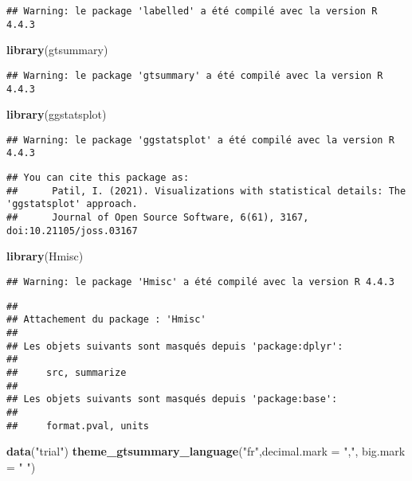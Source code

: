 \documentclass[
]{article}
\newenvironment{Shaded}{\begin{snugshade}}{\end{snugshade}}
\newcommand{\AttributeTok}[1]{\textcolor[rgb]{0.13,0.29,0.53}{#1}}
\newcommand{\FunctionTok}[1]{\textcolor[rgb]{0.13,0.29,0.53}{\textbf{#1}}}
\newcommand{\NormalTok}[1]{#1}
\newcommand{\StringTok}[1]{\textcolor[rgb]{0.31,0.60,0.02}{#1}}
\begin{document}
\begin{verbatim}
## Warning: le package 'labelled' a été compilé avec la version R 4.4.3
\end{verbatim}

\begin{Shaded}
\begin{Highlighting}[]
\FunctionTok{library}\NormalTok{(gtsummary)}
\end{Highlighting}
\end{Shaded}

\begin{verbatim}
## Warning: le package 'gtsummary' a été compilé avec la version R 4.4.3
\end{verbatim}

\begin{Shaded}
\begin{Highlighting}[]
\FunctionTok{library}\NormalTok{(ggstatsplot)}
\end{Highlighting}
\end{Shaded}

\begin{verbatim}
## Warning: le package 'ggstatsplot' a été compilé avec la version R 4.4.3
\end{verbatim}

\begin{verbatim}
## You can cite this package as:
##      Patil, I. (2021). Visualizations with statistical details: The 'ggstatsplot' approach.
##      Journal of Open Source Software, 6(61), 3167, doi:10.21105/joss.03167
\end{verbatim}

\begin{Shaded}
\begin{Highlighting}[]
\FunctionTok{library}\NormalTok{(Hmisc)}
\end{Highlighting}
\end{Shaded}

\begin{verbatim}
## Warning: le package 'Hmisc' a été compilé avec la version R 4.4.3
\end{verbatim}

\begin{verbatim}
## 
## Attachement du package : 'Hmisc'
## 
## Les objets suivants sont masqués depuis 'package:dplyr':
## 
##     src, summarize
## 
## Les objets suivants sont masqués depuis 'package:base':
## 
##     format.pval, units
\end{verbatim}

\begin{Shaded}
\begin{Highlighting}[]
\FunctionTok{data}\NormalTok{(}\StringTok{"trial"}\NormalTok{)}
\FunctionTok{theme\_gtsummary\_language}\NormalTok{(}\StringTok{"fr"}\NormalTok{,}\AttributeTok{decimal.mark =} \StringTok{","}\NormalTok{, }\AttributeTok{big.mark =} \StringTok{" "}\NormalTok{)}
\end{Highlighting}
\end{Shaded}
\end{document}
